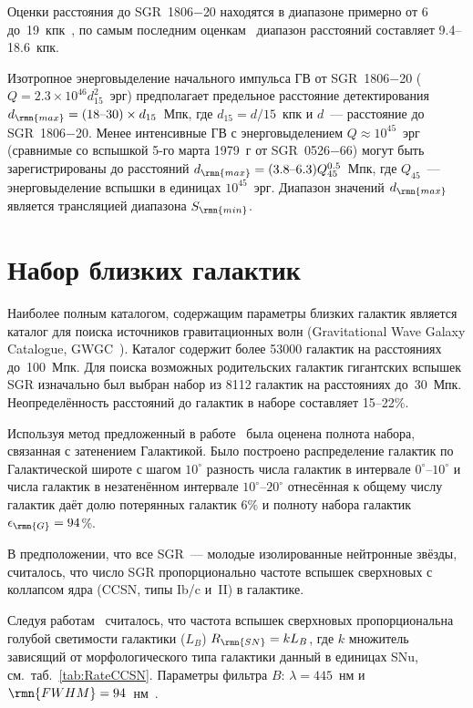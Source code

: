 Оценки расстояния до SGR~1806$-$20 находятся в диапазоне примерно от 6 
до~19~кпк~\citep{Tendulkar2012ApJ}, по самым последним оценкам~\citep{Svirski2011} 
диапазон расстояний составляет 9.4--18.6~кпк.

Изотропное энерговыделение начального импульса ГВ от SGR~1806$-$20 
($Q = 2.3\times 10^{46} d_{15}^2 $~эрг) предполагает предельное расстояние 
детектирования $d_{\rmn{max}} = (18\textrm{--}30)\times d_{15}$~Мпк, 
где $d_{15}=d/15$~кпк и $d$~--- расстояние до SGR~1806$-$20. 
Менее интенсивные ГВ с энерговыделением $Q \approx 10^{45}$~эрг 
(сравнимые со вспышкой 5-го марта 1979~г от SGR~0526$-$66) 
могут быть зарегистрированы до расстояний $d_{\rmn{max}} = (3.8\textrm{--}6.3) Q_{45}^{0.5}$~Мпк, 
где $Q_{45}$~--- энерговыделение вспышки в единицах $10^{45}$~эрг. 
Диапазон значений $d_{\rmn{max}}$ является трансляцией диапазона $S_{\rmn{min}}$.

\section{Набор близких галактик}
Наиболее полным каталогом, содержащим параметры близких галактик является 
каталог для поиска источников гравитационных волн (Gravitational Wave Galaxy Catalogue, 
GWGC~\citep{White2011CQGra}). Каталог содержит более 53000 галактик на расстояниях 
до~100~Мпк. Для поиска возможных родительских галактик гигантских вспышек SGR 
изначально был выбран набор из 8112 галактик на расстояниях до~30~Мпк. 
Неопределённость расстояний до галактик в наборе составляет 15--22\%.

Используя метод предложенный в работе~\citep{Ofek2007} была оценена полнота набора, 
связанная с затенением Галактикой. Было построено распределение галактик по Галактической 
широте с шагом $10^\circ$ разность числа галактик в интервале 
$0^\circ\textrm{--}10^\circ$ и числа галактик в незатенённом интервале 
$10^\circ\textrm{--}20^\circ$ отнесённая к общему числу галактик даёт долю 
потерянных галактик 6\% и полноту набора галактик $\epsilon_{\rmn{G}}=94$\%.

В предположении, что все SGR~--- молодые изолированные нейтронные звёзды, считалось, 
что число SGR пропорционально частоте вспышек сверхновых с коллапсом ядра 
(CCSN, типы Ib/c и~II) в галактике.

Следуя работам~\citep{Cappellaro1999, Boser2013} считалось, что частота вспышек 
сверхновых пропорциональна голубой светимости галактики ($L_{B}$) $R_{\rmn{SN}} = k L_{B}$, 
где $k$ множитель зависящий от морфологического типа галактики данный 
в единицах SNu, см.~таб.~\ref{tab:RateCCSN}. Параметры фильтра $B$: $\lambda=445$~нм 
и $\rmn{FWHM}=94$~нм~\citep{Binney1998GalAstr}.

